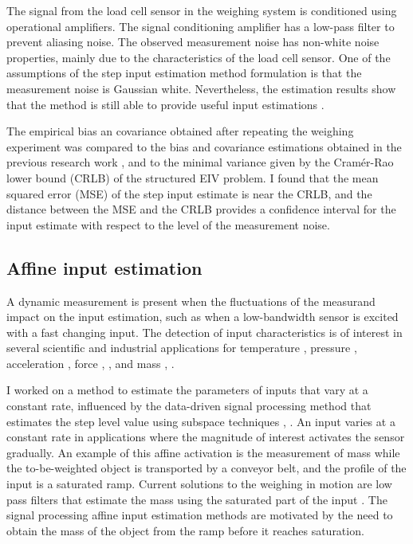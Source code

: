 The signal from the load cell sensor in the weighing system is conditioned using operational amplifiers.
The signal conditioning amplifier has a low-pass filter to prevent aliasing noise.
The observed measurement noise has non-white noise properties, mainly due to the characteristics of the load cell sensor.
One of the assumptions of the step input estimation method formulation is that the measurement noise is Gaussian white. 
Nevertheless, the estimation results show that the method is still able to provide useful input estimations \citep{QuintanaTIM}.

The empirical bias an covariance obtained after repeating the weighing experiment was compared to the bias and covariance estimations obtained in the previous research work \citep{QuintanaCSDA}, and to the minimal variance given by the  Cram\'er-Rao lower bound (CRLB) of the structured EIV problem.
I found that the mean squared error (MSE) of the step input estimate is near the CRLB, and the distance between the MSE and the CRLB provides a confidence interval for the input estimate with respect to the level of the measurement noise. 

 
\subsection{Affine input estimation}

A dynamic measurement is present when the fluctuations of the measurand impact on the input estimation, such as when a low-bandwidth sensor is excited with a fast changing input.
The detection of input characteristics is of interest in several scientific and industrial applications for temperature \citep{Saggin01}, pressure \citep{Matthews14}, acceleration \citep{Link07}, force \citep{Vlajic16}, \citep{Hessling08a}, and mass \citep{Shu93}, \citep{Boschetti13}.

I worked on a method to estimate the parameters of inputs that vary at a constant rate, influenced by the data-driven signal processing method that estimates the step level value using subspace techniques \citep{Markovsky15cep}, \citep{Markovsky15ieee}.
An input varies at a constant rate in applications where the magnitude of interest activates the sensor gradually. 
An example of this affine activation is the measurement of mass while the to-be-weighted object is transported by a conveyor belt, and the profile of the input is a saturated ramp.
Current solutions to the weighing in motion are low pass filters that estimate the mass using the saturated part of the input \citep{Tasaki07, Pietrzak14}.
The signal processing affine input estimation methods are motivated by the need to obtain the mass of the object from the ramp before it reaches saturation.

